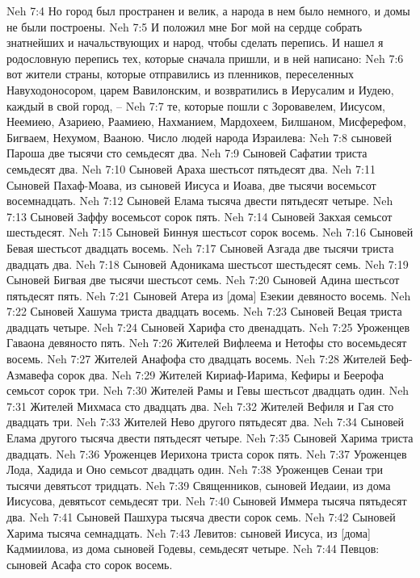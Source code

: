 Neh 7:4  Но город был пространен и велик, а народа в нем было немного, и домы не были построены.
Neh 7:5  И положил мне Бог мой на сердце собрать знатнейших и начальствующих и народ, чтобы сделать перепись. И нашел я родословную перепись тех, которые сначала пришли, и в ней написано:
Neh 7:6  вот жители страны, которые отправились из пленников, переселенных Навуходоносором, царем Вавилонским, и возвратились в Иерусалим и Иудею, каждый в свой город, --
Neh 7:7  те, которые пошли с Зоровавелем, Иисусом, Неемиею, Азариею, Раамиею, Нахманием, Мардохеем, Билшаном, Мисферефом, Бигваем, Нехумом, Вааною. Число людей народа Израилева:
Neh 7:8  сыновей Пароша две тысячи сто семьдесят два.
Neh 7:9  Сыновей Сафатии триста семьдесят два.
Neh 7:10  Сыновей Араха шестьсот пятьдесят два.
Neh 7:11  Сыновей Пахаф-Моава, из сыновей Иисуса и Иоава, две тысячи восемьсот восемнадцать.
Neh 7:12  Сыновей Елама тысяча двести пятьдесят четыре.
Neh 7:13  Сыновей Заффу восемьсот сорок пять.
Neh 7:14  Сыновей Закхая семьсот шестьдесят.
Neh 7:15  Сыновей Биннуя шестьсот сорок восемь.
Neh 7:16  Сыновей Бевая шестьсот двадцать восемь.
Neh 7:17  Сыновей Азгада две тысячи триста двадцать два.
Neh 7:18  Сыновей Адоникама шестьсот шестьдесят семь.
Neh 7:19  Сыновей Бигвая две тысячи шестьсот семь.
Neh 7:20  Сыновей Адина шестьсот пятьдесят пять.
Neh 7:21  Сыновей Атера из [дома] Езекии девяносто восемь.
Neh 7:22  Сыновей Хашума триста двадцать восемь.
Neh 7:23  Сыновей Вецая триста двадцать четыре.
Neh 7:24  Сыновей Харифа сто двенадцать.
Neh 7:25  Уроженцев Гаваона девяносто пять.
Neh 7:26  Жителей Вифлеема и Нетофы сто восемьдесят восемь.
Neh 7:27  Жителей Анафофа сто двадцать восемь.
Neh 7:28  Жителей Беф-Азмавефа сорок два.
Neh 7:29  Жителей Кириаф-Иарима, Кефиры и Беерофа семьсот сорок три.
Neh 7:30  Жителей Рамы и Гевы шестьсот двадцать один.
Neh 7:31  Жителей Михмаса сто двадцать два.
Neh 7:32  Жителей Вефиля и Гая сто двадцать три.
Neh 7:33  Жителей Нево другого пятьдесят два.
Neh 7:34  Сыновей Елама другого тысяча двести пятьдесят четыре.
Neh 7:35  Сыновей Харима триста двадцать.
Neh 7:36  Уроженцев Иерихона триста сорок пять.
Neh 7:37  Уроженцев Лода, Хадида и Оно семьсот двадцать один.
Neh 7:38  Уроженцев Сенаи три тысячи девятьсот тридцать.
Neh 7:39  Священников, сыновей Иедаии, из дома Иисусова, девятьсот семьдесят три.
Neh 7:40  Сыновей Иммера тысяча пятьдесят два.
Neh 7:41  Сыновей Пашхура тысяча двести сорок семь.
Neh 7:42  Сыновей Харима тысяча семнадцать.
Neh 7:43  Левитов: сыновей Иисуса, из [дома] Кадмиилова, из дома сыновей Годевы, семьдесят четыре.
Neh 7:44  Певцов: сыновей Асафа сто сорок восемь.
